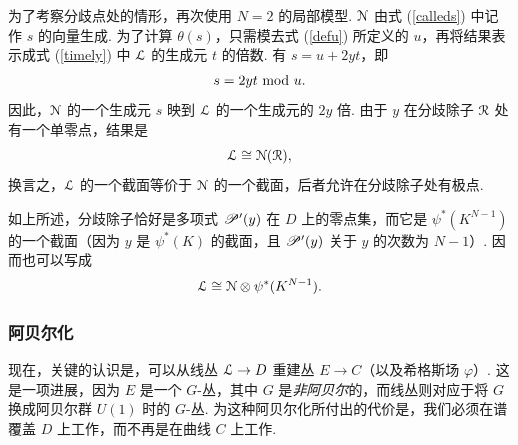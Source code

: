 为了考察分歧点处的情形，再次使用 $N=2$ 的局部模型. ${\cal N}$ 由式 (\ref{calleds}) 中记作 $s$ 的向量生成. 为了计算 $\theta(s)$，只需模去式 (\ref{defu}) 所定义的 $u$，再将结果表示成式 (\ref{timely}) 中 ${\cal L}$ 的生成元 $t$ 的倍数. 有 $s=u+2yt$，即
\begin{equation}
\label{burble}
s = 2yt ~{\rm mod}~ u.
\end{equation}
因此，${\cal N}$ 的一个生成元 $s$ 映到 ${\cal L}$ 的一个生成元的 $2y$ 倍. 由于 $y$ 在分歧除子 ${\cal R}$ 处有一个单零点，结果是
\begin{equation}
\label{troygo}
{\cal L}\cong {\cal N}({\cal R}),
\end{equation}
换言之，${\cal L}$ 的一个截面等价于 ${\cal N}$ 的一个截面，后者允许在分歧除子处有极点.

如上所述，分歧除子恰好是多项式 $\large{\mathscr P}'(y)$ 在 $D$ 上的零点集，而它是 $\psi^*(K^{N-1})$ 的一个截面（因为 $y$ 是 $\psi^*(K)$ 的截面，且 $\large{\mathscr P}'(y)$ 关于 $y$ 的次数为 $N-1$）. 因而也可以写成
\begin{equation}
\label{roygo} {\cal L}\cong {\cal N}\otimes \psi^*(K^{N-1}).
\end{equation}

\subsubsection{阿贝尔化}

现在，关键的认识是，可以从线丛 ${\cal L}\to D$ 重建丛 $E\to C$（以及希格斯场 $\varphi$）. 这是一项进展，因为 $E$ 是一个 $G$-丛，其中 $G$ 是{\it 非阿贝尔}的，而线丛则对应于将 $G$ 换成阿贝尔群 $U(1)$ 时的 $G$-丛. 为这种阿贝尔化所付出的代价是，我们必须在谱覆盖 $D$ 上工作，而不再是在曲线 $C$ 上工作.

